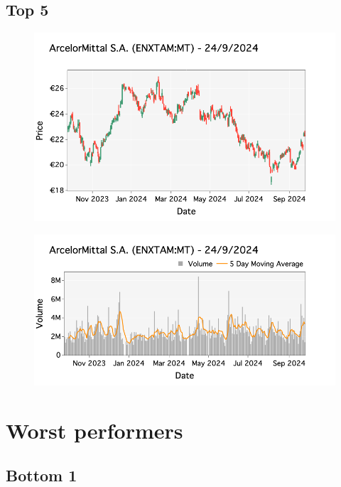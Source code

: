 \documentclass[a4paper, twocolumn, 11pt, paperequity]{gorgona}
\begin{document}
\subsection*{Top 5}

\begin{figure}[H]
    \centering
    \includegraphics[width=\columnwidth]{France/images/Top_Returns/Top_5_candlestick.png}
\end{figure}

\begin{figure}[H]
    \centering
    \includegraphics[width=\columnwidth]{France/images/Top_Returns/Top_5_volume.png}
\end{figure}


\newpage
\section*{Worst performers}

\subsection*{Bottom 1}
\end{document}
